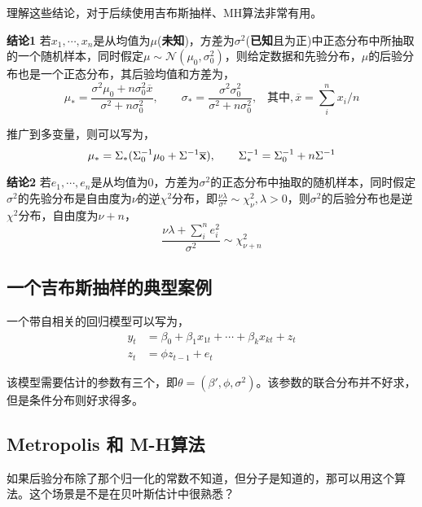 \documentclass[
]{book}
\begin{document}
理解这些结论，对于后续使用吉布斯抽样、MH算法非常有用。

\textbf{结论1} 若\(x_1,\cdots,x_n\)是从均值为\(\mu\)(\textbf{未知})，方差为\(\sigma^2\)(\textbf{已知}且为正)中正态分布中所抽取的一个随机样本，同时假定\(\mu\sim \mathcal{N}(\mu_0,\sigma_0^2)\)，则给定数据和先验分布，\(\mu\)的后验分布也是一个正态分布，其后验均值和方差为，
\[\mu_* = \frac{\sigma^2\mu_0+n\sigma_0^2\overline x}{\sigma^2+n\sigma_0^2},\hspace{2em}\sigma_*=\frac{\sigma^2\sigma^2_0}{\sigma^2+n\sigma^2_0},\;\;\;\text{其中},\overline x= \sum_i^n x_i/n\]

推广到多变量，则可以写为，
\[{\mu}_*=\Sigma_*(\Sigma_0^{-1}{\mu}_0+\Sigma^{-1}\overline{\bf{x}}), \hspace{2em}\Sigma_*^{-1} = \Sigma_0^{-1}+n\Sigma^{-1}\]

\textbf{结论2} 若\(e_1,\cdots,e_n\)是从均值为0，方差为\(\sigma^2\)的正态分布中抽取的随机样本，同时假定\(\sigma^2\)的先验分布是自由度为\(\nu\)的逆\(\chi^2\)分布，即\(\frac{\nu\lambda}{\sigma^2}\sim \chi^2_\nu,\lambda>0\)，则\(\sigma^2\)的后验分布也是逆\(\chi^2\)分布，自由度为\(\nu+n\)，
\[\frac{\nu\lambda+\sum_i^ne_i^2}{\sigma^2}\sim \chi^2_{\nu+n}\]

\hypertarget{ux4e00ux4e2aux5409ux5e03ux65afux62bdux6837ux7684ux5178ux578bux6848ux4f8b}{%
\subsection{一个吉布斯抽样的典型案例}\label{ux4e00ux4e2aux5409ux5e03ux65afux62bdux6837ux7684ux5178ux578bux6848ux4f8b}}

一个带自相关的回归模型可以写为，
\begin{align}
y_t&=\beta_0+\beta_1x_{1t}+\cdots+\beta_kx_{kt}+z_t\\
z_t&=\phi z_{t-1}+e_t
\end{align}

该模型需要估计的参数有三个，即\(\theta = (\beta',\phi,\sigma^2)\)。该参数的联合分布并不好求，但是条件分布则好求得多。

\hypertarget{metropolis-ux548c-m-hux7b97ux6cd5}{%
\subsection{Metropolis 和 M-H算法}\label{metropolis-ux548c-m-hux7b97ux6cd5}}

如果后验分布除了那个归一化的常数不知道，但分子是知道的，那可以用这个算法。这个场景是不是在贝叶斯估计中很熟悉？
\end{document}
